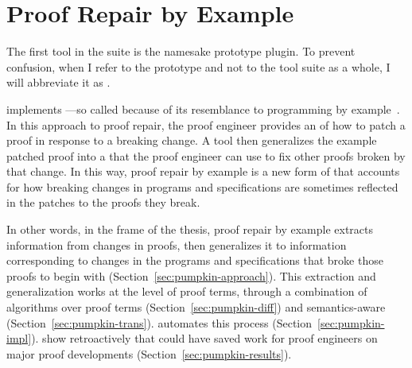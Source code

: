 \chapter{Proof Repair by Example}
\label{ch:example}

The first tool in the    suite is the namesake \sysnamelong prototype plugin.
To prevent confusion, when I refer to the \sysnamelong prototype and not to the tool suite as a whole, I will abbreviate it as \intro{\sysname}.

\sysname implements ---so called because of its resemblance to programming by example~\cite{DBLP:journals/ftpl/GulwaniPS17}.
In this approach to proof repair, the proof engineer provides an  of how to patch a proof in response to a breaking change.
A tool then generalizes the example patched proof into a  that the proof engineer can use to fix other proofs broken by that change.
In this way, proof repair by example is a new form of  that accounts for how 
breaking changes in programs and specifications are sometimes reflected in the patches to the proofs they break.

In other words, in the frame of the thesis, proof repair by example extracts information from changes in proofs,
then generalizes it to information corresponding to changes in the programs and specifications that broke those proofs to begin with (Section~\ref{sec:pumpkin-approach}).
This extraction and generalization works at the level of proof terms, through a combination of  algorithms 
over proof terms (Section~\ref{sec:pumpkin-diff}) and 
semantics-aware  (Section~\ref{sec:pumpkin-trans}).
 automates this process (Section~\ref{sec:pumpkin-impl}).
 show retroactively that \sysname could have saved work for proof engineers
on major proof developments (Section~\ref{sec:pumpkin-results}).
















